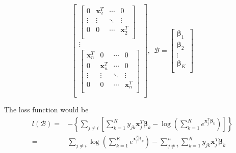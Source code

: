 \documentclass[letter]{article}
\begin{document}
$$\begin{bmatrix}
\begin{bmatrix}
	0 & \bm{x}_2^T & \cdots & 0 \\
	\vdots & \vdots & \ddots & \vdots \\
	0 & 0 & \cdots & \bm{x}_2^T \\
	\end{bmatrix} \\
	\vdots \\
	\begin{bmatrix}
	\bm{x}_n^T & 0 & \cdots & 0 \\
	0 & \bm{x}_n^T & \cdots & 0 \\
	\vdots & \vdots & \ddots & \vdots \\
	0 & 0 & \cdots & \bm{x}_n^T \\
	\end{bmatrix} \\
	\end{bmatrix},\ \ 
	\bm{\mathcal{B}}=\begin{bmatrix}
	\bm{\beta}_{1} \\
	\bm{\beta}_{2} \\
	\vdots \\
	\bm{\beta}_{K} \\
	\end{bmatrix}$$
	
	The loss function would be 
	$$\begin{aligned}
	l(\bm{\mathcal{B}})=&-\left\{\sum_{j\neq i}\left[\sum_{k=1}^K
	y_{jk}\bm{x}_j^T\bm{\beta}_k-
	\log\left(\sum_{k=1}^Ke^{\bm{x}_j^T\bm{\beta}_k}\right)
	\right]\right\}\\
	=&\sum_{j\neq i}\log\left(\sum_{k=1}^Ke^{\bm{x}_j^T\bm{\beta}_k}\right)-
	\sum_{j\neq i}^n\sum_{k=1}^Ky_{jk}\bm{x}_j^T\bm{\beta}_k \\
	\end{aligned}$$
	
\end{document}
